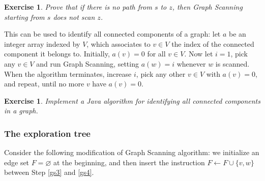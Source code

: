 \documentclass[a4paper]{book}
\theoremstyle{changebreak}                %
\newtheorem{ex}[result]{Exercise}
\begin{document}
\begin{ex}
Prove that if there is no path from $s$ to $z$, then {\sc Graph
  Scanning} starting from $s$ does not scan $z$.
\end{ex}

This can be used to identify all connected components of a graph: let
$a$ be an integer array indexed by $V$, which associates to $v\in V$
the index of the connected component it belongs to. Initially,
$a(v)=0$ for all $v\in V$. Now let $i=1$, pick any $v\in V$ and run
{\sc Graph Scanning}, setting $a(w)=i$ whenever $w$ is scanned. When
the algorithm terminates, increase $i$, pick any other $v\in V$ with
$a(v)=0$, and repeat, until no more $v$ have $a(v)=0$. 

\begin{ex}
Implement a Java algorithm for identifying all connected components in
a graph.
\end{ex}

\subsubsection{The exploration tree}
\label{s:graphalg:tree}
Consider the following modification of {\sc Graph
  Scanning} algorithm: we
initialize an edge set $F=\varnothing$ at the beginning, and then
insert the instruction $F\leftarrow F\cup\{v,w\}$ between Step
\ref{gs3} and \ref{gs4}.
\end{document}

